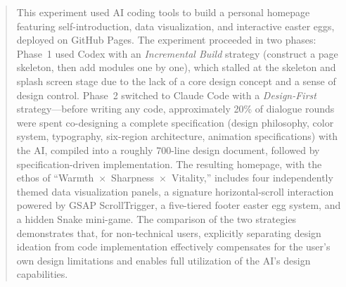 \begin{abstract}
This experiment used AI coding tools to build a personal homepage featuring self-introduction, data visualization, and interactive easter eggs, deployed on GitHub Pages.
The experiment proceeded in two phases: Phase~1 used Codex with an \textit{Incremental Build} strategy (construct a page skeleton, then add modules one by one), which stalled at the skeleton and splash screen stage due to the lack of a core design concept and a sense of design control.
Phase~2 switched to Claude Code with a \textit{Design-First} strategy---before writing any code, approximately 20\% of dialogue rounds were spent co-designing a complete specification (design philosophy, color system, typography, six-region architecture, animation specifications) with the AI, compiled into a roughly 700-line design document, followed by specification-driven implementation.
The resulting homepage, with the ethos of ``Warmth~$\times$~Sharpness~$\times$~Vitality,'' includes four independently themed data visualization panels, a signature horizontal-scroll interaction powered by GSAP ScrollTrigger, a five-tiered footer easter egg system, and a hidden Snake mini-game.
The comparison of the two strategies demonstrates that, for non-technical users, explicitly separating design ideation from code implementation effectively compensates for the user's own design limitations and enables full utilization of the AI's design capabilities.
\end{abstract}
